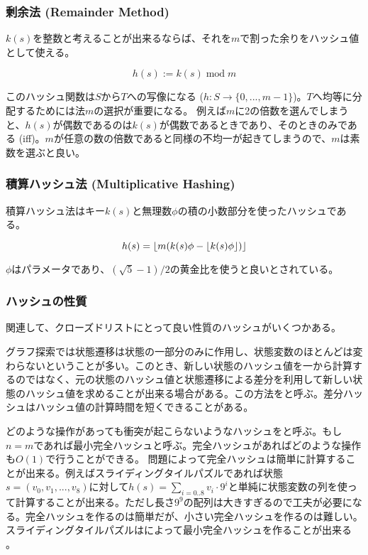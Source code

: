 \subsubsection{剰余法 (Remainder Method)}

$k(s)$を整数と考えることが出来るならば、それを$m$で割った余りをハッシュ値として使える。

\begin{equation}
  h(s) := k(s) \; \text{mod} \; m
\end{equation}
  
このハッシュ関数は$S$から$T$への写像になる ($h: S \rightarrow \{0, ..., m-1\}$)。$T$へ均等に分配するためには法$m$の選択が重要になる。
例えば$m$に2の倍数を選んでしまうと、$h(s)$が偶数であるのは$k(s)$が偶数であるときであり、そのときのみである (iff)。$m$が任意の数の倍数であると同様の不均一が起きてしまうので、$m$は素数を選ぶと良い。


\subsubsection{積算ハッシュ法 (Multiplicative Hashing)}
積算ハッシュ法はキー$k(s)$と無理数$\phi$の積の小数部分を使ったハッシュである。

\begin{equation}
	h(s) = \lfloor m (k(s) \phi - \lfloor k(s) \phi\rfloor)\rfloor
\end{equation}

$\phi$はパラメータであり、$(\sqrt{5} - 1) / 2$の黄金比を使うと良いとされている。

\subsubsection{ハッシュの性質}

関連して、クローズドリストにとって良い性質のハッシュがいくつかある。

グラフ探索では状態遷移は状態の一部分のみに作用し、状態変数のほとんどは変わらないということが多い。このとき、新しい状態のハッシュ値を一から計算するのではなく、元の状態のハッシュ値と状態遷移による差分を利用して新しい状態のハッシュ値を求めることが出来る場合がある。この方法をと呼ぶ。差分ハッシュはハッシュ値の計算時間を短くできることがある。

どのような操作があっても衝突が起こらないようなハッシュをと呼ぶ。もし$n = m$であれば最小完全ハッシュと呼ぶ。完全ハッシュがあればどのような操作も$O(1)$で行うことができる。
問題によって完全ハッシュは簡単に計算することが出来る。例えばスライディングタイルパズルであれば状態$s = (v_0, v_1,...,v_8)$に対して$h(s) = \sum_{i = 0..8} v_i \cdot 9^i$と単純に状態変数の列を使って計算することが出来る。ただし長さ$9^9$の配列は大きすぎるので工夫が必要になる。完全ハッシュを作るのは簡単だが、小さい完全ハッシュを作るのは難しい。スライディングタイルパズルはによって最小完全ハッシュを作ることが出来る \cite{korf2005large}。


